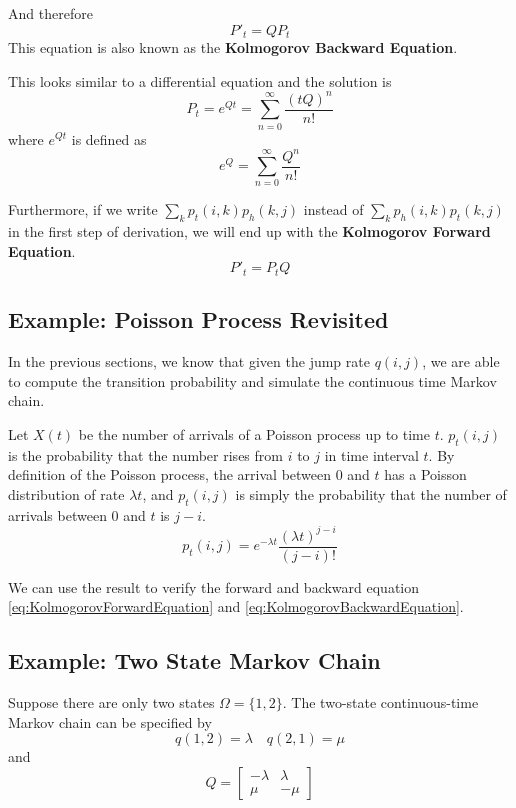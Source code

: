     And therefore
    \begin{equation}\label{eq:KolmogorovBackwardEquation}
        P'_t = QP_t
    \end{equation}
    This equation is also known as the \textbf{Kolmogorov Backward Equation}.

    This looks similar to a differential equation and the solution is
    \[ P_t = e^{Qt} = \sum_{n=0}^{\infty}\frac{(tQ)^n}{n!} \]
    where $e^{Qt}$ is defined as
    \[ e^Q = \sum_{n=0}^{\infty} \frac{Q^n}{n!} \]

    Furthermore, if we write $\sum_{k}p_t(i,k)p_h(k,j)$ instead of $\sum_{k}p_h(i,k)p_t(k,j)$ in the first step of derivation, we will end up with the \textbf{Kolmogorov Forward Equation}.
    \begin{equation}\label{eq:KolmogorovForwardEquation}
        P'_t = P_tQ
    \end{equation}

    \subsection{Example: Poisson Process Revisited}
        In the previous sections, we know that given the jump rate $q(i,j)$, we are able to compute the transition probability and simulate the continuous time Markov chain.

        Let $X(t)$ be the number of arrivals of a Poisson process up to time $t$. $p_t(i,j)$ is the probability that the number rises from $i$ to $j$ in time interval $t$. By definition of the Poisson process, the arrival between $0$ and $t$ has a Poisson distribution of rate $\lambda t$, and $p_t(i,j)$ is simply the probability that the number of arrivals between $0$ and $t$ is $j-i$.
        \[ p_t(i,j) = e^{-\lambda t}\frac{(\lambda t)^{j-i}}{(j-i)!} \]

        We can use the result to verify the forward and backward equation \ref{eq:KolmogorovForwardEquation} and \ref{eq:KolmogorovBackwardEquation}.

    \subsection{Example: Two State Markov Chain}
        Suppose there are only two states $\Omega = \{1,2\}$. The two-state continuous-time Markov chain can be specified by
        \[ q(1,2) = \lambda \quad q(2,1) = \mu \]
        and
        \[ Q = \begin{bmatrix}
            -\lambda & \lambda\\
            \mu & -\mu
        \end{bmatrix} \]

